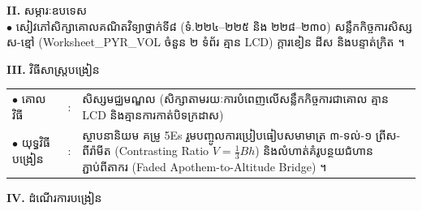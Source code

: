 \documentclass[a4paper,10pt]{article}
\newcommand{\en}[1]{{\TimesEn #1}}
\begin{document}
{%
\textbf{II.} {\muol សម្ភារៈឧបទេស}\\[1pt]
\hspace*{0.55cm}$\bullet$ \hspace{0.35cm} សៀវភៅសិក្សាគោលគណិតវិទ្យាថ្នាក់ទី៨ (ទំ.២២៤--២២៥ និង ២២៨--២៣០) សន្លឹកកិច្ចការសិស្ស ស-ខ្មៅ (\en{Worksheet\_PYR\_VOL} ចំនួន ២ ទំព័រ គ្មាន \en{LCD}) ក្ដារខៀន ដីស និងបន្ទាត់ក្រិត ។

\vspace{3pt}

\textbf{III.} {\muol វិធីសាស្រ្តបង្រៀន}\\[1pt]
\hspace*{0.45cm}%
\begin{tabular}{@{}l l L{14.85cm}@{}}
  $\bullet$ \hspace{0.25cm} គោលវិធី & : & សិស្សមជ្ឈមណ្ឌល (សិក្សាតាមរយៈការបំពេញលើសន្លឹកកិច្ចការជាគោល គ្មាន \en{LCD} និងគ្មានការកាត់បិទក្រដាស) \\
  $\bullet$ \hspace{0.25cm} យុទ្ធវិធីបង្រៀន & : & ស្ថាបនានិយម គម្រូ \en{5Es} រួមបញ្ចូលការប្រៀបធៀបសមាមាត្រ ៣-ទល់-១ ព្រីស-ពីរ៉ាមីត (\en{Contrasting Ratio} $V=\frac{1}{3}Bh$) និងលំហាត់គំរូបន្ថយជំហានភ្ជាប់ពីតាករ (\en{Faded Apothem-to-Altitude Bridge}) ។ \\
\end{tabular}
}

\vspace{3pt}

\textbf{IV.} {\muol ដំណើរការបង្រៀន}

\vspace{2pt}
\end{document}
